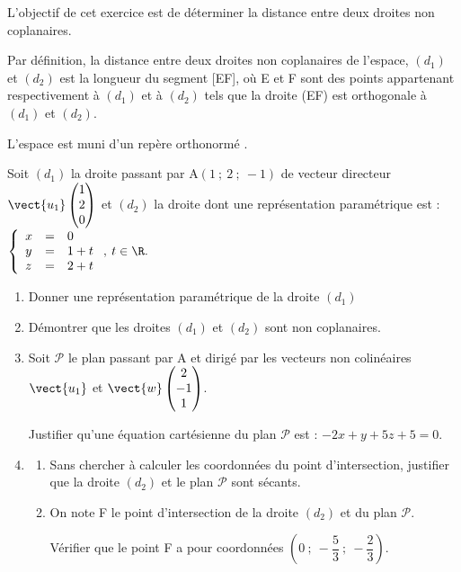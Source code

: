 \medskip

L'objectif de cet exercice est de déterminer la distance entre deux droites non coplanaires.

Par définition, la distance entre deux droites non coplanaires de l'espace, $(d_1)$ et $(d_2)$ est la longueur du segment [EF], où E et F sont des points appartenant respectivement à $(d_1)$ et à $(d_2)$ tels que la droite (EF) est orthogonale à $(d_1)$ et $(d_2)$.

L'espace est muni d'un repère orthonormé \Oijk.

Soit $(d_1)$ la droite passant par A$(1~;~2~;~-1)$ de vecteur directeur $\vect{u_1}\begin{pmatrix}1\\2\\0\end{pmatrix}$ et $(d_2)$ la droite dont une représentation paramétrique est : 
$\left\{\begin{array}{l c l}
x&=&0\\y &=& 1 + t\\z &=& 2 + t\\
\end{array}\right.,\: t  \in \R.$

\medskip

\begin{enumerate}
\item Donner une représentation paramétrique de la droite $(d_1)$
\item Démontrer que les droites $(d_1)$ et $(d_2)$ sont non coplanaires.
\item Soit $\mathcal{P}$ le plan passant par A et dirigé par les vecteurs non colinéaires $\vect{u_1}$ et $\vect{w}\begin{pmatrix}2\\-1\\1\\\end{pmatrix}$.

Justifier qu'une équation cartésienne du plan $\mathcal{P}$ est : $-2x +y +5z +5 = 0$.
\item
	\begin{enumerate}
		\item Sans chercher à calculer les coordonnées du point d'intersection, justifier que la droite
$(d_2)$ et le plan $\mathcal{P}$ sont sécants.
		\item On note F le point d'intersection de la droite $(d_2)$ et du plan $\mathcal{P}$.
		
Vérifier que le point F a pour coordonnées $\left(0~;~- \dfrac53~;~- \dfrac23\right)$.
\end{enumerate}
\end{enumerate}
		

